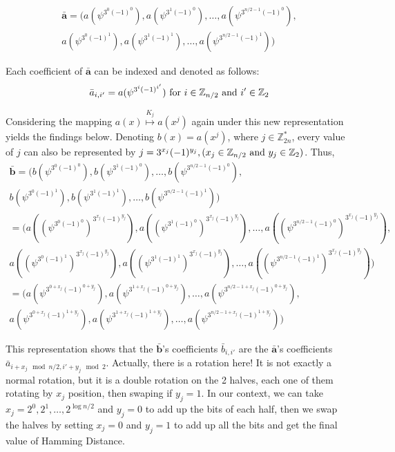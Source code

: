 \begin{description}
  \begin{align*}
       \mathbf{\bar{a}} = (a(\psi^{3^{0}(-1)^{0}}),a(\psi^{3^{1}(-1)^{0}}), \dots,
    a(\psi^{3^{n/2 -1}(-1)^{0}}), \\ a(\psi^{3^{0}(-1)^{1}}),
    a(\psi^{3^{1}(-1)^{1}}), \dots,a(\psi^{3^{n/2 -1}(-1)^{1}}))
  \end{align*}

  Each coefficient of \(\mathbf{\bar{a}}\) can be indexed and denoted as follows:
  \[
    \bar{a}_{i,i'} = a(\psi^{3^{i}(-1)^{i'}}) \textnormal{ for } i \in
    \mathbb{Z}_{n/2} \textnormal{ and } i' \in \mathbb{Z}_{2}
  \]

  Considering the mapping \(a(x) \stackrel{K_{j}}{\mapsto} a(x^{j})\) again under this new
  representation yields the findings below. Denoting \(b(x) = a(x^{j})\), where
  \(j \in \mathbb{Z}_{2n}^{*}\), every value of \(j\) can also be
  represented by
  \(j = 3^{x_{j}}(-1)^{y_{j}}, (x_{j} \in \mathbb{Z}_{n/2} \textnormal{ and }
  y_{j} \in \mathbb{Z}_{2})\). Thus,
  \begin{align*}
    \mathbf{\bar{b}} = (b(\psi^{3^{0}(-1)^{0}}),b(\psi^{3^{1}(-1)^{0}}), \dots,
    b(\psi^{3^{n/2 -1}(-1)^{0}}), \\ b(\psi^{3^{0}(-1)^{1}}),
    b(\psi^{3^{1}(-1)^{1}}), \dots,b(\psi^{3^{n/2 -1}(-1)^{1}}))\\
    = (a((\psi^{3^{0}(-1)^{0}})^{3^{x_{j}}(-1)^{y_{j}}}),a((\psi^{3^{1}(-1)^{0}})^{3^{x_{j}}(-1)^{y_{j}}}), \dots,
    a((\psi^{3^{n/2 -1}(-1)^{0}})^{3^{x_{j}}(-1)^{y_{j}}}), \\ a((\psi^{3^{0}(-1)^{1}})^{3^{x_{j}}(-1)^{y_{j}}}),
    a((\psi^{3^{1}(-1)^{1}})^{3^{x_{j}}(-1)^{y_{j}}}), \dots,a((\psi^{3^{n/2 -1}(-1)^{1}})^{3^{x_{j}}(-1)^{y_{j}}}))\\
    = (a(\psi^{3^{0 + x_{j}}(-1)^{0 + y_{j}}}), a(\psi^{3^{1 + x_{j}}(-1)^{0 + y_{j}}}), \dots,a(\psi^{3^{n/2 - 1 + x_{j}}(-1)^{0 + y_{j}}}),\\
    a(\psi^{3^{0 + x_{j}}(-1)^{1 + y_{j}}}), a(\psi^{3^{1 + x_{j}}(-1)^{1 + y_{j}}}), \dots, a(\psi^{3^{n/2 - 1 + x_{j}}(-1)^{1 + y_{j}}}))
  \end{align*}

  This representation shows that the \(\mathbf{\bar{b}}\)'s coefficients
  \(\bar{b}_{i,i'}\) are the \(\mathbf{\bar{a}}\)'s coefficients\\
  \(\bar{a}_{i+x_{j} \mod n/2, i' + y_{j} \mod 2}\). Actually, there is a
  rotation here! It is not exactly a normal rotation, but it is a double rotation on
  the 2 halves, each one of them rotating by \(x_{j}\) position, then swaping
  if \(y_{j} = 1\). In our context, we can take
  \(x_{j} = 2^{0}, 2^{1}, \dots, 2^{\log n/2}\) and \(y_{j} = 0\) to add up the
  bits of each half, then we swap the halves by setting \(x_{j} = 0\) and
  \(y_{j} = 1\) to add up all the bits and get the final value of Hamming
  Distance.
  

\end{description}
